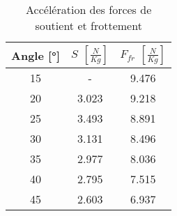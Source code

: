 \begin{table}
\centering
\begin{tabular}{|c|c|c|}
\hline
Angle [°] &$S$ $\left[ \frac{N}{Kg} \right]$ & $F_{fr}$ $\left[ \frac{N}{Kg} \right]$ \\
           \hline
15        &- & 9.476 \\
           \hline
20        &3.023 & 9.218 \\
           \hline
25        &3.493 & 8.891 \\
           \hline
30        &3.131 & 8.496 \\
           \hline
35        &2.977 & 8.036 \\
           \hline
40        &2.795 & 7.515 \\
           \hline
45        &2.603 & 6.937 \\
           \hline
\end{tabular}
\caption{Accélération des forces de soutient et frottement}
\label{table:v-abb}
\end{table}
